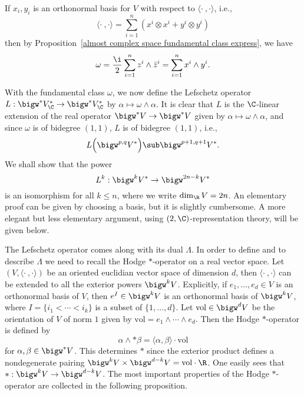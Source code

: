\begin{example}
If $x_i,y_i$ is an orthonormal basis for $V$ with respect to $\langle\cdot\ ,\cdot\rangle$, i.e.,
\[\langle\cdot\ ,\cdot\rangle=\sum_{i=1}^{n}(x^i\otimes x^i+y^i\otimes y^i)\]
then by Proposition~\ref{almost complex space fundamental class express}, we have
\[\omega=\frac{\i}{2}\sum_{i=1}^{n}z^i\wedge\bar{z}^i=\sum_{i=1}^{n}x^i\wedge y^i.\]
\end{example}
With the fundamental class $\omega$, we now define the Lefschetz operator $L:\bigw^*V^*_{\C}\to\bigw^*V^*_{\C}$ by $\alpha\mapsto\omega\wedge\alpha$. It is clear that $L$ is the $\C$-linear extension of the real operator $\bigw^*V\to\bigw^*V$ given by $\alpha\mapsto\omega\wedge\alpha$, and since $\omega$ is of bidegree $(1,1)$, $L$ is of bidegree $(1,1)$, i.e.,
\[L\Big(\bigw^{p,q}V^*\Big)\sub\bigw^{p+1,q+1}V^*.\]
We shall show that the power
\[L^k:\bigw^kV^*\to\bigw^{2n-k}V^*\]
is an isomorphism for all $k\leq n$, where we write $\dim_{\R}V=2n$. An elementary proof can be given by choosing a basis, but it is slightly cumbersome. A more elegant but less elementary argument, using $\sl(2,\C)$-representation theory, will be given below.\par
The Lefschetz operator comes along with its dual $\Lambda$. In order to define and to describe $\Lambda$ we need to recall the Hodge $\ast$-operator on a real vector space. Let $(V,\langle\cdot\ ,\cdot\rangle)$ be an oriented euclidian vector space of dimension $d$, then $\langle\cdot\ ,\cdot\rangle$ can be extended to all the exterior powers $\bigw^kV$. Explicitly, if $e_1,\dots,e_d\in V$ is an orthonormal basis of $V$, then $e^I\in\bigw^kV$ is an orthonormal basis of $\bigw^kV$, where $I=\{i_1<\cdots<i_k\}$ is a subset of $\{1,\dots,d\}$. Let $\mathrm{vol}\in\bigw^dV$ be the orientation of $V$ of norm $1$ given by $\mathrm{vol}=e_1\wedge\cdots\wedge e_d$. Then the Hodge $\ast$-operator is defined by
\[\alpha\wedge\ast\beta=\langle\alpha,\beta\rangle\cdot\mathrm{vol}\]
for $\alpha,\beta\in\bigw^*V$. This determines $\ast$ since the exterior product defines a nondegenerate pairing $\bigw^kV\times\bigw^{d-k}V=\mathrm{vol}\cdot\R$. One easily sees that $\ast:\bigw^kV\to\bigw^{d-k}V$. The most important properties of the Hodge $\ast$-operator are collected in the following proposition.
